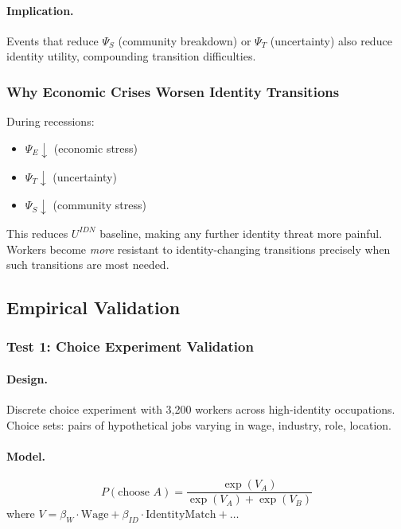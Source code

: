\paragraph{Implication.}
Events that reduce $\Psi_S$ (community breakdown) or $\Psi_T$ (uncertainty) 
also reduce identity utility, compounding transition difficulties.

\subsubsection{Why Economic Crises Worsen Identity Transitions}

During recessions:
\begin{itemize}
    \item $\Psi_E \downarrow$ (economic stress)
    \item $\Psi_T \downarrow$ (uncertainty)
    \item $\Psi_S \downarrow$ (community stress)
\end{itemize}

This reduces $U^{IDN}$ baseline, making any further identity threat 
more painful. Workers become \emph{more} resistant to identity-changing 
transitions precisely when such transitions are most needed.

\subsection{Empirical Validation}

\subsubsection{Test 1: Choice Experiment Validation}

\paragraph{Design.}
Discrete choice experiment with 3,200 workers across high-identity occupations.
Choice sets: pairs of hypothetical jobs varying in wage, industry, role, location.

\paragraph{Model.}
\begin{equation}
P(\text{choose } A) = \frac{\exp(V_A)}{\exp(V_A) + \exp(V_B)}
\end{equation}
where $V = \beta_W \cdot \text{Wage} + \beta_{ID} \cdot \text{IdentityMatch} + \ldots$

